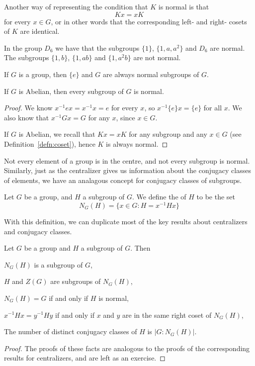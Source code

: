 Another way of representing the condition that $K$ is normal is that
\[
  Kx = xK
\]
for every $x \in G$, or in other words that the corresponding left- and right-
cosets of $K$ are identical.

\begin{example}
  In the group $D_{6}$ we have that the subgroups $\{1\}$, $\{1, a, a^{2}\}$
  and $D_{6}$ are normal.  The subgroups $\{1, b\}$, $\{1, ab\}$ and $\{1, 
  a^{2}b\}$ are not normal.
\end{example}

\begin{lemma}
  If $G$ is a group, then $\{e\}$ and $G$ are always normal subgroups of
  $G$.

  If $G$ is Abelian, then every subgroup of $G$ is normal.
\end{lemma}
\begin{proof}
  We know $x^{-1}ex = x^{-1}x = e$ for every $x$, so $x^{-1}\{e\}x = \{e\}$
  for all $x$.  We also know that $x^{-1}Gx = G$ for any $x$, since $x \in
  G$.

  If $G$ is Abelian, we recall that $Kx = xK$ for any subgroup and any $x
  \in G$ (see Definition~\ref{defn:coset}), hence $K$ is always normal.
\end{proof}

Not every element of a group is in the centre, and not every subgroup is
normal.  Similarly, just as the centralizer gives us information about the
conjugacy classes of elements, we have an analagous concept for conjugacy
classes of subgroups.

\begin{definition}
  Let $G$ be a group, and $H$ a subgroup of $G$.  We define the
   of $H$ to be the set
  \[
    N_{G}(H) = \{ x \in G : H = x^{-1}Hx \}
  \]
\end{definition}

With this definition, we can duplicate most of the key results about
centralizers and conjugacy classes.

\begin{theorem}\label{thm:normalizers}
  Let $G$ be a group and $H$ a subgroup of $G$.  Then
  \begin{theoremenum}
    \item $N_{G}(H)$ is a subgroup of $G$,
    \item $H$ and $Z(G)$ are subgroups of $N_{G}(H)$,
    \item $N_{G}(H) = G$ if and only if $H$ is normal,
    \item $x^{-1}Hx = y^{-1}Hy$ if and only if $x$ and $y$ are in the same
      right coset of $N_{G}(H)$,
    \item The number of distinct conjugacy classes of $H$ is $|G :
      N_{G}(H)|$.
  \end{theoremenum}
\end{theorem}
\begin{proof}
  The proofs of these facts are analogous to the proofs of the corresponding
  results for centralizers, and are left as an exercise.
\end{proof}

